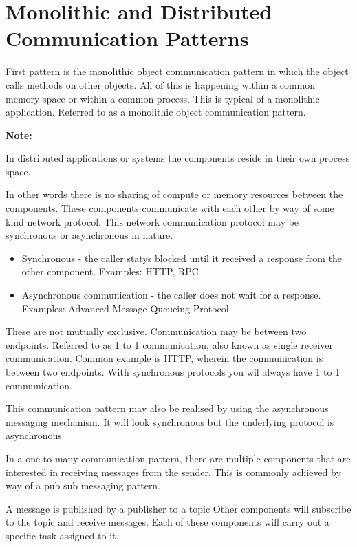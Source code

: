 \documentclass[a4paper, 11pt]{book}
\newenvironment{note}{
    \begin{siderule}
        \textbf{Note: }
        }{
    \end{siderule}
}
\begin{document}
    \section{Monolithic and Distributed Communication Patterns}
    First pattern is the monolithic object communication pattern in which the object calls methods on other objects.
    All of this is happening within a common memory space or within a common process.
    This is typical of a monolithic application.
    Referred to as a monolithic object communication pattern.

    \begin{note}
        In distributed applications or systems the components reside in their own process space.
    \end{note}
    In other words there is no sharing of compute or memory resources between the components.
    These components communicate with each other by way of some kind network protocol.
    This network communication protocol may be synchronous or asynchronous in nature.
    \begin{itemize}
        \item Synchronous - the caller statys blocked until it received a response from the other component. Examples: HTTP, RPC
        \item Asynchronous communication - the caller does not wait for a response. Examples: Advanced Message Queueing Protocol
    \end{itemize}

    These are not mutually exclusive.
    Communication may be between two endpoints.
    Referred to as 1 to 1 communication, also known as single receiver communication.
    Common example is HTTP, wherein the communication is between two endpoints.
    With synchronous protocols you wil always have 1 to 1 communication.

    This communication pattern may also be realised by using the asynchronous messaging mechanism.
    It will look synchronous but the underlying protocol is asynchronous

    In a one to many communication pattern, there are multiple components that are interested in receiving messages from the sender.
    This is commonly achieved by way of a pub sub messaging pattern.
    \begin{list}
        \list A message is published by a publisher to a topic
        \list Other components will subscribe to the topic and receive messages.
        \list Each of these components will carry out a specific task assigned to it.
    \end{list}
\end{document}
